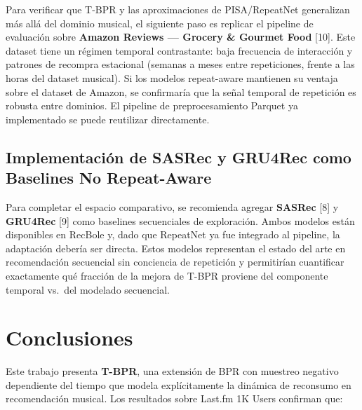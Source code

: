 \documentclass{article}
\begin{document}
Para verificar que T-BPR y las aproximaciones de PISA/RepeatNet generalizan más allá del dominio musical, el siguiente paso es replicar el pipeline de evaluación sobre \textbf{Amazon Reviews --- Grocery \& Gourmet Food} {[}10{]}. Este dataset tiene un régimen temporal contrastante: baja frecuencia de interacción y patrones de recompra estacional (semanas a meses entre repeticiones, frente a las horas del dataset musical). Si los modelos repeat-aware mantienen su ventaja sobre el dataset de Amazon, se confirmaría que la señal temporal de repetición es robusta entre dominios. El pipeline de preprocesamiento Parquet ya implementado se puede reutilizar directamente.

\subsection{Implementación de SASRec y GRU4Rec como Baselines No Repeat-Aware}\label{implementaciuxf3n-de-sasrec-y-gru4rec-como-baselines-no-repeat-aware}

Para completar el espacio comparativo, se recomienda agregar \textbf{SASRec} {[}8{]} y \textbf{GRU4Rec} {[}9{]} como baselines secuenciales de exploración. Ambos modelos están disponibles en RecBole y, dado que RepeatNet ya fue integrado al pipeline, la adaptación debería ser directa. Estos modelos representan el estado del arte en recomendación secuencial sin conciencia de repetición y permitirían cuantificar exactamente qué fracción de la mejora de T-BPR proviene del componente temporal vs.~del modelado secuencial.

\section{Conclusiones}\label{conclusiones}

Este trabajo presenta \textbf{T-BPR}, una extensión de BPR con muestreo negativo dependiente del tiempo que modela explícitamente la dinámica de reconsumo en recomendación musical. Los resultados sobre Last.fm 1K Users confirman que:
\end{document}
